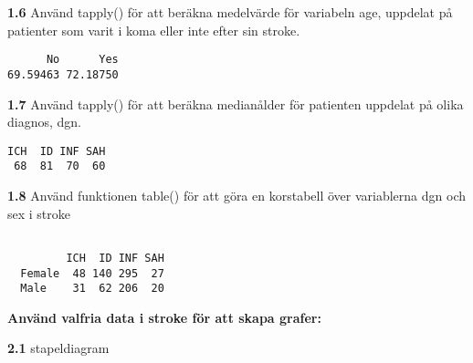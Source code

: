 \documentclass[
  letterpaper,
  DIV=11,
  numbers=noendperiod]{scrartcl}
\newenvironment{Shaded}{\begin{snugshade}}{\end{snugshade}}
\newcommand{\AttributeTok}[1]{\textcolor[rgb]{0.40,0.45,0.13}{#1}}
\newcommand{\ConstantTok}[1]{\textcolor[rgb]{0.56,0.35,0.01}{#1}}
\newcommand{\FunctionTok}[1]{\textcolor[rgb]{0.28,0.35,0.67}{#1}}
\newcommand{\NormalTok}[1]{\textcolor[rgb]{0.00,0.23,0.31}{#1}}
\newcommand{\SpecialCharTok}[1]{\textcolor[rgb]{0.37,0.37,0.37}{#1}}
\begin{document}
\textbf{1.6} Använd tapply() för att beräkna medelvärde för variabeln
age, uppdelat på patienter som varit i koma eller inte efter sin stroke.

\begin{Shaded}
\end{Shaded}

\begin{verbatim}
      No      Yes 
69.59463 72.18750 
\end{verbatim}

\textbf{1.7} Använd tapply() för att beräkna medianålder för patienten
uppdelat på olika diagnos, dgn.

\begin{Shaded}
\end{Shaded}

\begin{verbatim}
ICH  ID INF SAH 
 68  81  70  60 
\end{verbatim}

\textbf{1.8} Använd funktionen table() för att göra en korstabell över
variablerna dgn och sex i stroke

\begin{Shaded}
\end{Shaded}

\begin{verbatim}
        
         ICH  ID INF SAH
  Female  48 140 295  27
  Male    31  62 206  20
\end{verbatim}

\textbf{Använd valfria data i stroke för att skapa grafer:}

\textbf{2.1} stapeldiagram

\begin{Shaded}
\end{Shaded}
\end{document}
